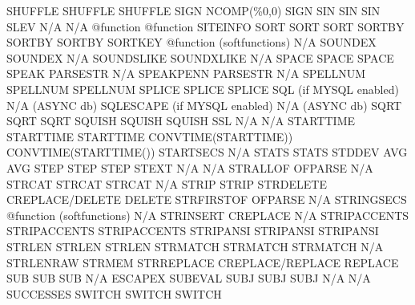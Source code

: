 \documentclass[letterpaper,10pt,english]{sphinxmanual}
\begin{document}
\begin{description}
SHUFFLE                 SHUFFLE                      SHUFFLE
SIGN                    NCOMP(\%0,0)                  SIGN
SIN                     SIN                          SIN
SLEV                    N/A                          N/A
@function               @function                    SITEINFO
SORT                    SORT                         SORT
SORTBY                  SORTBY                       SORTBY
SORTKEY                 @function (softfunctions)    N/A
SOUNDEX                 SOUNDEX                      N/A
SOUNDSLIKE              SOUNDXLIKE                   N/A
SPACE                   SPACE                        SPACE
SPEAK                   PARSESTR                     N/A
SPEAKPENN               PARSESTR                     N/A
SPELLNUM                SPELLNUM                     SPELLNUM
SPLICE                  SPLICE                       SPLICE
SQL                     (if MYSQL enabled)           N/A (ASYNC db)
SQLESCAPE               (if MYSQL enabled)           N/A (ASYNC db)
SQRT                    SQRT                         SQRT
SQUISH                  SQUISH                       SQUISH
SSL                     N/A                          N/A
STARTTIME               STARTTIME                    STARTTIME
CONVTIME(STARTTIME))    CONVTIME(STARTTIME())        STARTSECS
N/A                     STATS                        STATS
STDDEV                  AVG                          AVG
STEP                    STEP                         STEP
STEXT                   N/A                          N/A
STRALLOF                OFPARSE                      N/A
STRCAT                  STRCAT                       STRCAT
N/A                     STRIP                        STRIP
STRDELETE               CREPLACE/DELETE              DELETE
STRFIRSTOF              OFPARSE                      N/A
STRINGSECS              @function (softfunctions)    N/A
STRINSERT               CREPLACE                     N/A
STRIPACCENTS            STRIPACCENTS                 STRIPACCENTS
STRIPANSI               STRIPANSI                    STRIPANSI
STRLEN                  STRLEN                       STRLEN
STRMATCH                STRMATCH                     STRMATCH
N/A                     STRLENRAW                    STRMEM
STRREPLACE              CREPLACE/REPLACE             REPLACE
SUB                     SUB                          SUB
N/A                     ESCAPEX                      SUBEVAL
SUBJ                    SUBJ                         SUBJ
N/A                     N/A                          SUCCESSES
SWITCH                  SWITCH                       SWITCH

\end{description}
\end{document}
